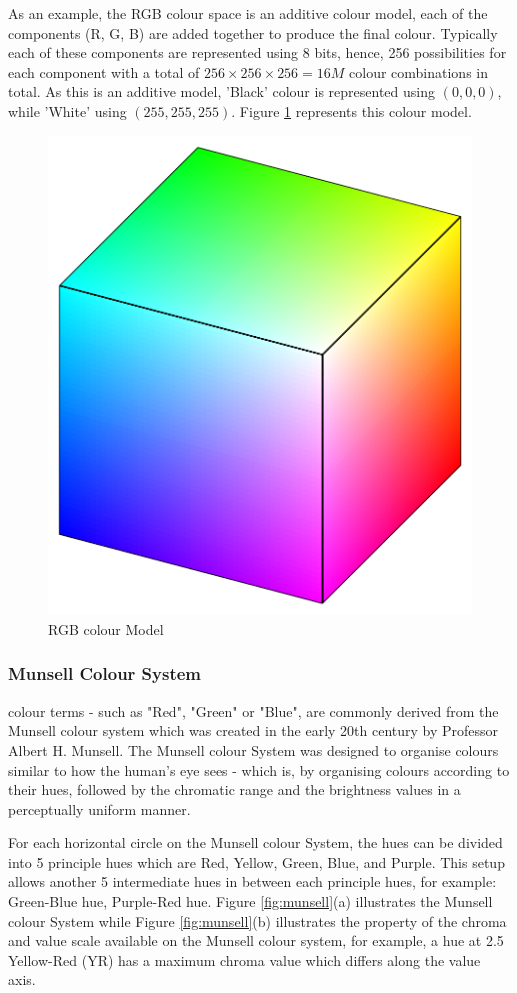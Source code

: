As an example, the RGB colour space is an additive colour model, each of the components (R, G, B) are added together to produce the final colour. Typically each of these components are represented using 8 bits, hence, 256 possibilities for each component with a total of $256 \times 256 \times 256 = 16M$ colour combinations in total. As this is an additive model, 'Black' colour is  represented using $(0, 0, 0)$, while 'White' using $(255, 255, 255)$. Figure \ref{fig:rgb} represents this colour model.

\begin{figure}[hbt!]\centering
\includegraphics[width=.4\textwidth]{image/lit/rgbcolor.jpg}
\caption{RGB colour Model}
\label{fig:rgb}
\end{figure}


\subsubsection{Munsell Colour System}
\label{section:munsellcs}
colour terms - such as "Red", "Green" or "Blue", are commonly derived from the Munsell colour system which was created in the early 20th century by Professor Albert H. Munsell. The Munsell colour System was designed to organise colours similar to how the human's eye sees - which is, by organising colours according to their hues, followed by the chromatic range and the brightness values in a perceptually uniform manner. 

For each horizontal circle on the Munsell colour System, the hues can be divided into 5 principle hues which are Red, Yellow, Green, Blue, and Purple. This setup allows another 5 intermediate hues in between each principle hues, for example: Green-Blue hue, Purple-Red hue. 
Figure \ref{fig:munsell}(a) illustrates the Munsell colour System while Figure \ref{fig:munsell}(b) illustrates the property of the chroma and value scale available on the Munsell colour system, for example, a hue at 2.5 Yellow-Red (YR) has a maximum chroma value which differs along the value axis. 



